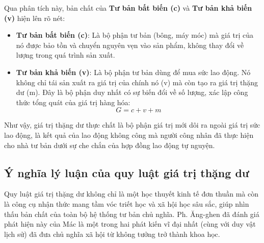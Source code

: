 Qua phân tích này, bản chất của \textbf{Tư bản bất biến (c)} và \textbf{Tư bản khả biến (v)} hiện lên rõ nét:
\begin{itemize}
    \item \textbf{Tư bản bất biến (c)}: Là bộ phận tư bản (bông, máy móc) mà giá trị của nó được bảo tồn và chuyển nguyên vẹn vào sản phẩm, không thay đổi về lượng trong quá trình sản xuất.
    \item \textbf{Tư bản khả biến (v)}: Là bộ phận tư bản dùng để mua sức lao động. Nó không chỉ tái sản xuất ra giá trị của chính nó (v) mà còn tạo ra giá trị thặng dư (m). Đây là bộ phận duy nhất có sự biến đổi về số lượng, xác lập công thức tổng quát của giá trị hàng hóa:
    \[
        G = c + v + m 
    \]
\end{itemize}
Như vậy, giá trị thặng dư thực chất là bộ phận giá trị mới dôi ra ngoài giá trị sức lao động, là kết quả của lao động không công mà người công nhân đã thực hiện cho nhà tư bản dưới sự che chắn của hợp đồng lao động tự nguyện.

\subsection{Ý nghĩa lý luận của quy luật giá trị thặng dư}
Quy luật giá trị thặng dư không chỉ là một học thuyết kinh tế đơn thuần mà còn là công cụ nhận thức mang tầm vóc triết học và xã hội học sâu sắc, giúp nhìn thấu bản chất của toàn bộ hệ thống tư bản chủ nghĩa. Ph. Ăng-ghen đã đánh giá phát hiện này của Mác là một trong hai phát kiến vĩ đại nhất (cùng với duy vật lịch sử) đã đưa chủ nghĩa xã hội từ không tưởng trở thành khoa học.

